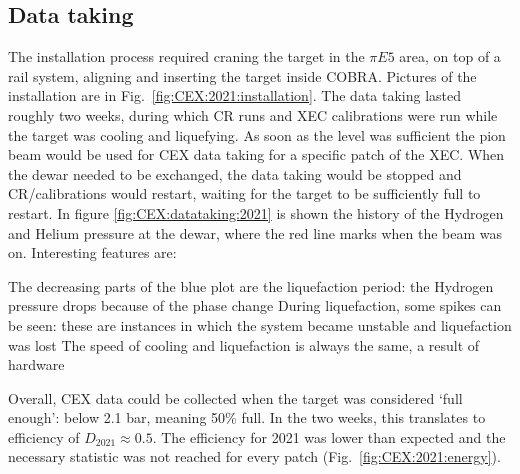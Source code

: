 \begin{refsection}
    \subsection{Data taking}
        The installation process required craning the target in the $\pi E5$ area, on top of a rail system, aligning and inserting the target inside COBRA.
        Pictures of the installation are in Fig.~\ref{fig:CEX:2021:installation}.
        The data taking lasted roughly two weeks, during which CR runs and XEC calibrations were run while the target was cooling and liquefying. 
        As soon as the level was sufficient the pion beam would be used for CEX data taking for a specific patch of the XEC.  
        When the dewar needed to be exchanged, the data taking would be stopped and CR/calibrations would restart, waiting for the target to be sufficiently full to restart.
        \noindent
        In figure \ref{fig:CEX:datataking:2021} is shown the history of the Hydrogen and Helium pressure at the dewar, where the red line marks when the beam was on. 
        Interesting features are:
        \begin{outline}
            \1 The decreasing parts of the blue plot are the liquefaction period: the Hydrogen pressure drops because of the phase change
            \1 During liquefaction, some spikes can be seen: these are instances in which the system became unstable and liquefaction was lost
            \1 The speed of cooling and liquefaction is always the same, a result of hardware 
        \end{outline}
        Overall, CEX data could be collected when the target was considered `full enough': below 2.1 bar, meaning 50\% full. 
        In the two weeks, this translates to efficiency of $D_{2021}\approx0.5$.
        The efficiency for 2021 was lower than expected and the necessary statistic was not reached for every patch (Fig.~\ref{fig:CEX:2021:energy}).


\end{refsection}

